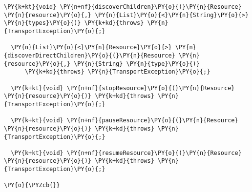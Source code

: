 \begin{Verbatim}[commandchars=\\\{\}]
  \PY{k+kt}{void} \PY{n+nf}{discoverChildren}\PY{o}{(}\PY{n}{Resource} \PY{n}{resource}\PY{o}{,} \PY{n}{List}\PY{o}{<}\PY{n}{String}\PY{o}{>} \PY{n}{types}\PY{o}{)} \PY{k+kd}{throws} \PY{n}{TransportException}\PY{o}{;}

  \PY{n}{List}\PY{o}{<}\PY{n}{Resource}\PY{o}{>} \PY{n}{discoverDirectChildren}\PY{o}{(}\PY{n}{Resource} \PY{n}{resource}\PY{o}{,} \PY{n}{String} \PY{n}{type}\PY{o}{)} 
	  \PY{k+kd}{throws} \PY{n}{TransportException}\PY{o}{;}

  \PY{k+kt}{void} \PY{n+nf}{stopResource}\PY{o}{(}\PY{n}{Resource} \PY{n}{resource}\PY{o}{)} \PY{k+kd}{throws} \PY{n}{TransportException}\PY{o}{;}

  \PY{k+kt}{void} \PY{n+nf}{pauseResource}\PY{o}{(}\PY{n}{Resource} \PY{n}{resource}\PY{o}{)} \PY{k+kd}{throws} \PY{n}{TransportException}\PY{o}{;}

  \PY{k+kt}{void} \PY{n+nf}{resumeResource}\PY{o}{(}\PY{n}{Resource} \PY{n}{resource}\PY{o}{)} \PY{k+kd}{throws} \PY{n}{TransportException}\PY{o}{;}

\PY{o}{\PYZcb{}}
\end{Verbatim}
